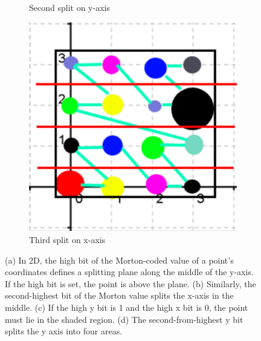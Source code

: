 \documentclass[11pt,a4paper]{article}
\begin{document}
\begin{figure}[H]
\begin{subfigure}[b]{0.3\textwidth}
         \caption{Second split on y-axis}
         \label{fig:pi_5000}
     \end{subfigure}
     \hfill
     \begin{subfigure}[b]{0.3\textwidth}
         \centering
         \captionsetup{justification=centering,margin=2cm}
         \includegraphics[width=\textwidth]{images/example_lbvh/03.png}
         \caption{Third split on x-axis}
         \label{fig:pi_18000}
     \end{subfigure}
        \caption{(a) In 2D, the high bit of the Morton-coded value of a point’s coordinates defines a splitting plane along the middle of the y-axis. If the high bit is set, the point is above the plane. (b) Similarly, the second-highest bit of the Morton value splits the x-axis in the middle. (c) If the high y bit is 1 and the high x bit is 0, the point must lie in the shaded region. (d) The second-from-highest y bit splits the y axis into four areas. }
        \label{fig:three graphs}
\end{figure}
\end{document}
